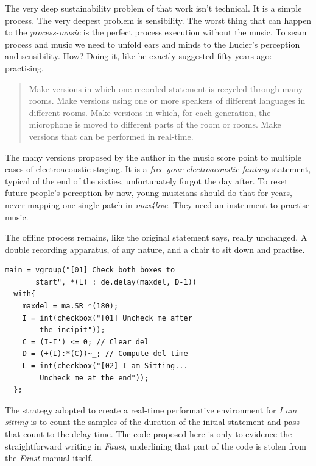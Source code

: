 \documentclass[twoside,a4paper]{article}
\begin{document}

The very deep sustainability problem of that work isn't technical. It is a simple process. The very deepest problem is sensibility. The worst thing that can happen to the \emph{process-music} is the perfect process execution without the music. To seam process and music we need to unfold ears and minds to the Lucier's perception and sensibility. How? Doing it, like he exactly suggested fifty years ago: practising. 

\begin{quote}
Make versions in which one recorded statement is recycled through many rooms. Make versions using one or more speakers of different languages in different rooms. Make versions in which, for each generation, the microphone is moved to different parts of the room or rooms. Make versions that can be performed in real-time. \cite{lais69}
\end{quote}

The many versions proposed by the author in the music score point to multiple cases of electroacoustic staging. It is a \emph{free-your-electroacoustic-fantasy} statement, typical of the end of the sixties, unfortunately forgot the day after. To reset future people's perception by now, young musicians should do that for years, never mapping one single patch in \emph{max4live}. They need an instrument to practise music. 

The offline process remains, like the original statement says, really unchanged. A double recording apparatus, of any nature, and a chair to sit down and practise. 

\begin{lstlisting}
main = vgroup("[01] Check both boxes to
       start", *(L) : de.delay(maxdel, D-1))
  with{
    maxdel = ma.SR *(180);
    I = int(checkbox("[01] Uncheck me after
        the incipit"));
    C = (I-I') <= 0; // Clear del
    D = (+(I):*(C))~_; // Compute del time
    L = int(checkbox("[02] I am Sitting...
        Uncheck me at the end"));
  };
\end{lstlisting}

The strategy adopted to create a real-time performative environment for \emph{I am sitting} is to count the samples of the duration of the initial statement and pass that count to the delay time. The code proposed here is only to evidence the straightforward writing in \emph{Faust}, underlining that part of the code is stolen from the \emph{Faust} manual itself. 
\end{document}
